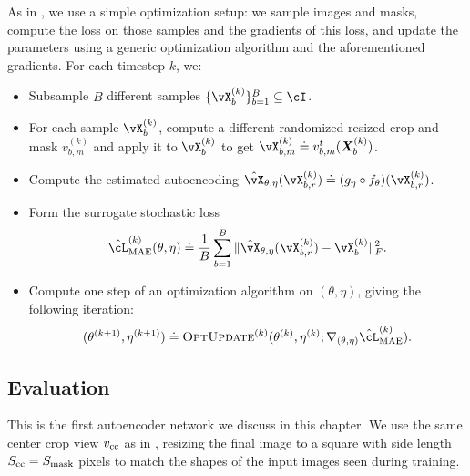 \documentclass[../../book-main.tex]{subfiles}
\begin{document}
As in , we use a simple optimization setup: we sample images and masks, compute the loss on those samples and the gradients of this loss, and update the parameters using a generic optimization algorithm and the aforementioned gradients. For each timestep \(k\), we:
\begin{itemize}
    \item Subsample \(B\) different samples \(\{\vX_{b}^{(k)}\}_{b = 1}^{B} \subseteq \cI\).
    \item For each sample \(\vX_{b}^{(k)}\), compute a different randomized resized crop and mask \(v_{b, m}^{(k)}\) and apply it to \(\vX_{b}^{(k)}\) to get \(\vX_{b, m}^{(k)} \doteq v_{b, m}^{t}(\X_{b}^{(k)})\).
    \item Compute the estimated autoencoding \(\hat{\vX}_{\theta, \eta}(\vX_{b, r}^{(k)}) \doteq (g_{\eta} \circ f_{\theta})(\vX_{b, r}^{(k)})\).
    \item Form the surrogate stochastic loss 
    \begin{equation}
        \hat{\cL}_{\mathrm{MAE}}^{(k)}(\theta, \eta) \doteq \frac{1}{B}\sum_{b = 1}^{B}\norm{\hat{\vX}_{\theta, \eta}(\vX_{b, r}^{(k)}) - \vX_{b}^{(k)}}_{F}^{2}.
    \end{equation}
    \item Compute one step of an optimization algorithm on \((\theta, \eta)\), giving the following iteration:
    \begin{equation}
        (\theta^{(k + 1)}, \eta^{(k + 1)}) \doteq \textsc{OptUpdate}^{(k)}(\theta^{(k)}, \eta^{(k)}; \nabla_{(\theta, \eta)}\hat{\cL}_{\mathrm{MAE}}^{(k)}).
    \end{equation}
\end{itemize}

\subsection{Evaluation} \label{sub:image_completion_optimization_1}

This is the first autoencoder network we discuss in this chapter. We use the same center crop view \(v_{\mathrm{cc}}\) as in , resizing the final image to a square with side length \(S_{\mathrm{cc}} = S_{\mathrm{mask}}\) pixels to match the shapes of the input images seen during training. 
\end{document}
